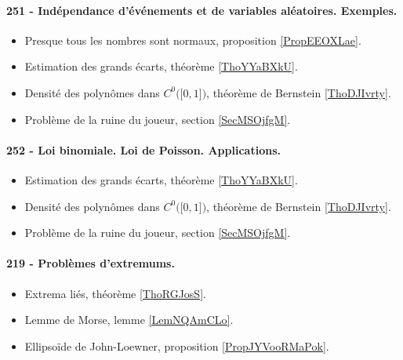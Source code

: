 \paragraph{251 - Indépendance d’événements et de variables aléatoires. Exemples.}
\begin{itemize}
    \item Presque tous les nombres sont normaux, proposition \ref{PropEEOXLae}.
    \item Estimation des grands écarts, théorème \ref{ThoYYaBXkU}.
    \item Densité des polynômes dans \( C^0\big( \mathopen[ 0 , 1 \mathclose] \big)\), théorème de Bernstein \ref{ThoDJIvrty}.
    \item Problème de la ruine du joueur, section \ref{SecMSOjfgM}.
\end{itemize}
\paragraph{252 - Loi binomiale. Loi de Poisson. Applications.}
\begin{itemize}
    \item Estimation des grands écarts, théorème \ref{ThoYYaBXkU}.
    \item Densité des polynômes dans \( C^0\big( \mathopen[ 0 , 1 \mathclose] \big)\), théorème de Bernstein \ref{ThoDJIvrty}.
    \item Problème de la ruine du joueur, section \ref{SecMSOjfgM}.
\end{itemize}
\paragraph{219 - Problèmes d'extremums.}
\begin{itemize}
    \item Extrema liés, théorème \ref{ThoRGJosS}.
    \item Lemme de Morse, lemme \ref{LemNQAmCLo}.
    \item Ellipsoïde de John-Loewner, proposition \ref{PropJYVooRMaPok}.
\end{itemize}
